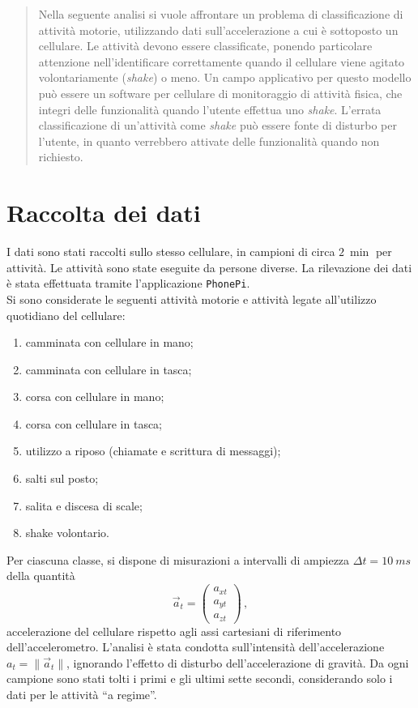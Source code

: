 \documentclass[./main.tex]{subfiles}
\begin{document}
\begin{abstract}
\normalsize
Nella seguente analisi si vuole affrontare un problema di classificazione di attività motorie, utilizzando dati sull'accelerazione a cui è sottoposto un cellulare. Le attività devono essere classificate, ponendo particolare attenzione nell'identificare correttamente quando il cellulare viene agitato volontariamente ({\em shake}) o meno. Un campo applicativo per questo modello può essere un software per cellulare di monitoraggio di attività fisica, che integri delle funzionalità quando l'utente effettua uno {\em shake}. L'errata classificazione di un'attività come {\em shake} può essere fonte di disturbo per l'utente, in quanto verrebbero attivate delle funzionalità quando non richiesto.
\end{abstract}
\section{Raccolta dei dati}
I dati sono stati raccolti sullo stesso cellulare, in campioni di circa $\SI{2}{\min}$ per attività. Le attività sono state eseguite da persone diverse. La rilevazione dei dati è stata effettuata tramite l'applicazione \texttt{PhonePi}\cite{kumarPhonePiSampleServer2019}.\\
Si sono considerate le seguenti attività motorie e attività legate all\rq{}utilizzo quotidiano del cellulare:
\begin{enumerate}
	\item camminata con cellulare in mano;
	\item camminata con cellulare in tasca;
	\item corsa con cellulare in mano;
	\item corsa con cellulare in tasca;
	\item utilizzo a riposo (chiamate e scrittura di messaggi);
	\item salti sul posto;
	\item salita e discesa di scale;
	\item shake volontario.
\end{enumerate}
Per ciascuna classe, si dispone di misurazioni a intervalli di ampiezza $\Delta t = \SI{10}{ms}$ della quantità
$$
\vec{a}_t = \begin{pmatrix}
a_{xt}\\
a_{yt}\\
a_{zt}
\end{pmatrix}\,,
$$
accelerazione del cellulare rispetto agli assi cartesiani di riferimento dell'accelerometro. L'analisi è stata condotta sull'intensità dell'accelerazione $a_t = \|\vec{a}_t\|$, ignorando l'effetto di disturbo dell'accelerazione di gravità. Da ogni campione sono stati tolti i primi e gli ultimi sette secondi, considerando solo i dati per le attività ``a regime''.
\end{document}
